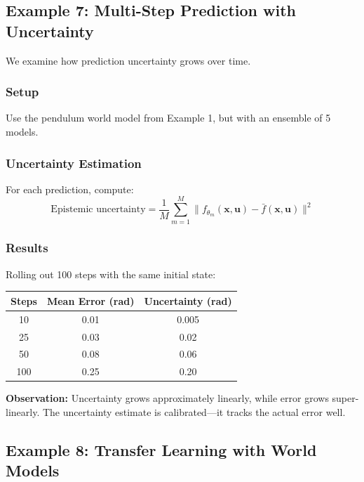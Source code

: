 \subsection{Example 7: Multi-Step Prediction with Uncertainty}

We examine how prediction uncertainty grows over time.

\subsubsection{Setup}

Use the pendulum world model from Example 1, but with an ensemble of 5 models.

\subsubsection{Uncertainty Estimation}

For each prediction, compute:
\begin{equation}
\text{Epistemic uncertainty} = \frac{1}{M}\sum_{m=1}^M \| f_{\theta_m}(\mathbf{x}, \mathbf{u}) - \bar{f}(\mathbf{x}, \mathbf{u}) \|^2
\end{equation}

\subsubsection{Results}

Rolling out 100 steps with the same initial state:

\begin{center}
\begin{tabular}{ccc}
\toprule
\textbf{Steps} & \textbf{Mean Error (rad)} & \textbf{Uncertainty (rad)} \\
\midrule
10 & 0.01 & 0.005 \\
25 & 0.03 & 0.02 \\
50 & 0.08 & 0.06 \\
100 & 0.25 & 0.20 \\
\bottomrule
\end{tabular}
\end{center}

\textbf{Observation:} Uncertainty grows approximately linearly, while error grows super-linearly. The uncertainty estimate is calibrated---it tracks the actual error well.

\subsection{Example 8: Transfer Learning with World Models}


